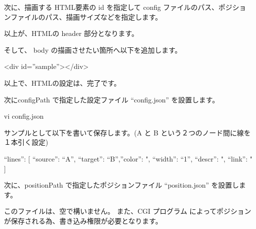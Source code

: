 \documentclass[mingoth,a4paper,twoside]{jsarticle}
\begin{document}
次に、描画する HTML要素の id を指定して config ファイルのパス、ポジションファイルのパス、描画サイズなどを指定します。


以上が、HTMLの header 部分となります。

そして、 body の描画させたい箇所へ以下を追加します。

\begin{commandline}
<div id=''sample''></div>
\end{commandline}

以上で、HTMLの設定は、完了です。

次にconfigPath で指定した設定ファイル ``config.json'' を設置します。

\begin{commandline}
  vi config.json
\end{commandline}


サンプルとして以下を書いて保存します。(A と B という２つのノード間に線を１本引く設定)

\begin{commandline}
{
    ``lines'': [
        { ``source'': ``A'', ``target'': ``B'',''color'': ", ``width'': ``1'', ``descr'': ", ``link'': " }
    ]
}
\end{commandline}

次に、positionPath で指定したポジションファイル ``position.json'' を設置します。

このファイルは、空で構いません。 また、CGI プログラム によってポジションが保存される為、書き込み権限が必要となります。
\end{document}
